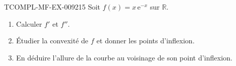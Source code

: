 \begin{exercice}{TCOMPL-MF-EX-009}{2}{15}
Soit $f(x)=x\,\mathrm{e}^{-x}$ sur $\mathbb{R}$.
\begin{enumerate}
  \item Calculer $f'$ et $f''$.
  \item Étudier la convexité de $f$ et donner les points d'inflexion.
  \item En déduire l'allure de la courbe au voisinage de son point
        d'inflexion.
\end{enumerate}
\end{exercice}

